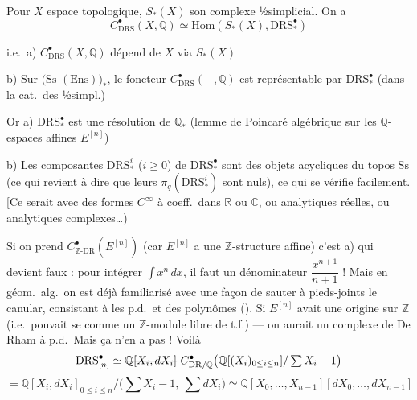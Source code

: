 \documentclass[11pt,a4paper]{article}
\begin{document}
Pour $X$ espace topologique, $S_*(X)$ son complexe ½simplicial. On a
\[ C^\bullet_{\mathrm{DRS}}(X,\mathbb{Q}) \simeq \mathrm{Hom}(S_*(X), \mathrm{DRS}^\bullet_*) \]

i.e.\ a) $C^\bullet_{\mathrm{DRS}}(X,\mathbb{Q})$ dépend de $X$ via $S_*(X)$

b) Sur $(\mathrm{Ss}$ \struck{\ill{}} $(\mathrm{Ens}))_*$, le foncteur $C^\bullet_{\mathrm{DRS}}(-,\mathbb{Q})$ est représentable par $\mathrm{DRS}^\bullet_*$ \quad (dans la cat.\ des  ½simpl.)

Or a) $\mathrm{DRS}^\bullet_*$ est une résolution de $\mathbb{Q}_*$ (lemme de Poincaré algébrique sur les $\mathbb{Q}$-espaces affines $E^{[n]}$)

b) Les composantes $\mathrm{DRS}^i_*$ ($i \geq 0$) de $\mathrm{DRS}^\bullet_*$ sont des objets acycliques du topos $\mathrm{Ss}$ (ce qui revient à dire que leurs $\pi_q(\mathrm{DRS}^i_*)$ sont nuls), ce qui se vérifie facilement. [Ce serait  avec des formes $C^\infty$ à coeff.\ dans $\mathbb{R}$ ou $\mathbb{C}$, ou analytiques réelles, ou analytiques complexes…)


Si on prend $C^\bullet_{\mathbb{Z}\text{-DR}}(E^{[n]})$ (car $E^{[n]}$ a une $\mathbb{Z}$-structure affine) c'est a) qui devient faux : pour intégrer $\int x^n\,dx$, il faut un dénominateur $\dfrac{x^{n+1}}{n+1}$ ! Mais en géom.\ alg.\ on est déjà familiarisé avec une façon de sauter à pieds-joints   le canular, consistant à  les p.d.\ et des polynômes  (). Si $E^{[n]}$ avait une origine sur $\mathbb{Z}$ (i.e.\ pouvait se  comme un $\mathbb{Z}$-module libre de t.f.) — on aurait un complexe de De Rham à p.d.\ Mais  ça n'en a pas ! Voilà
\[ \mathrm{DRS}^\bullet_{[n]} \simeq \text{\struck{$\mathbb{Q}[X_i, dX_i]$}}\ C^\bullet_{\mathrm{DR}/\mathbb{Q}}\bigl(\mathbb{Q}[(X_i)_{0 \leq i \leq n}]/\textstyle\sum X_i - 1\bigr) \]
\[ = \mathbb{Q}[X_i, dX_i]_{0 \leq i \leq n} \big/ \bigl(\textstyle\sum X_i - 1,\ \sum dX_i\bigr) \simeq \mathbb{Q}[X_0, \ldots, X_{n-1}][dX_0, \ldots, dX_{n-1}] \]
\end{document}
